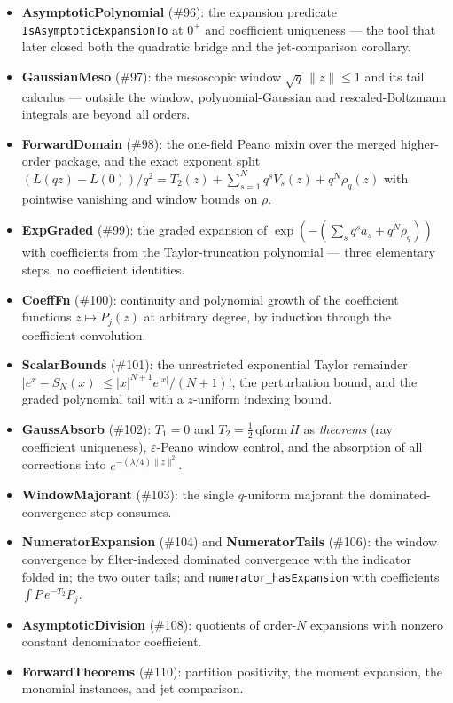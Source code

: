 \documentclass[11pt]{article}
\newcommand{\code}[1]{\texttt{#1}}
\begin{document}
\begin{itemize}
\item \textbf{AsymptoticPolynomial} (\#96): the expansion predicate
\code{IsAsymptoticExpansionTo} at $0^+$ and coefficient uniqueness ---
the tool that later closed both the quadratic bridge and the
jet-comparison corollary.
\item \textbf{GaussianMeso} (\#97): the mesoscopic window
$\sqrt q\,\|z\| \le 1$ and its tail calculus --- outside the window,
polynomial-Gaussian and rescaled-Boltzmann integrals are beyond all
orders.
\item \textbf{ForwardDomain} (\#98): the one-field Peano mixin over
the merged higher-order package, and the exact exponent split
$(L(qz)-L(0))/q^2 = T_2(z) + \sum_{s=1}^N q^s V_s(z) + q^N\rho_q(z)$
with pointwise vanishing and window bounds on $\rho$.
\item \textbf{ExpGraded} (\#99): the graded expansion of
$\exp(-(\sum_s q^s a_s + q^N \rho_q))$ with coefficients from the
Taylor-truncation polynomial --- three elementary steps, no
coefficient identities.
\item \textbf{CoeffFn} (\#100): continuity and polynomial growth of
the coefficient functions $z \mapsto P_j(z)$ at arbitrary degree, by
induction through the coefficient convolution.
\item \textbf{ScalarBounds} (\#101): the unrestricted exponential
Taylor remainder $|e^x - S_N(x)| \le |x|^{N+1}e^{|x|}/(N{+}1)!$, the
perturbation bound, and the graded polynomial tail with a
$z$-uniform indexing bound.
\item \textbf{GaussAbsorb} (\#102): $T_1 = 0$ and
$T_2 = \tfrac12\,\mathrm{qform}\,H$ as \emph{theorems} (ray
coefficient uniqueness), $\varepsilon$-Peano window control, and the
absorption of all corrections into $e^{-(\lambda/4)\|z\|^2}$.
\item \textbf{WindowMajorant} (\#103): the single $q$-uniform
majorant the dominated-convergence step consumes.
\item \textbf{NumeratorExpansion} (\#104) and \textbf{NumeratorTails}
(\#106): the window convergence by filter-indexed dominated
convergence with the indicator folded in; the two outer tails; and
\code{numerator\_hasExpansion} with coefficients
$\int P\, e^{-T_2} P_j$.
\item \textbf{AsymptoticDivision} (\#108): quotients of order-$N$
expansions with nonzero constant denominator coefficient.
\item \textbf{ForwardTheorems} (\#110): partition positivity, the
moment expansion, the monomial instances, and jet comparison.
\end{itemize}
\end{document}
